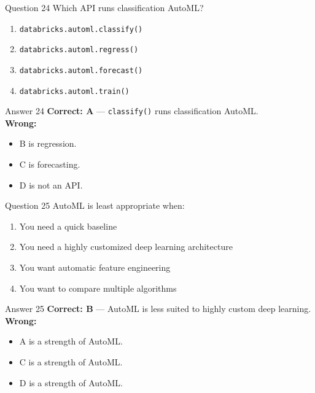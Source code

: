 \documentclass[aspectratio=169,11pt]{beamer}
\begin{document}
	\begin{frame}{Question 24}
		Which API runs classification AutoML?
		\begin{enumerate}[label=\Alph*.]
			\item \texttt{databricks.automl.classify()}
			\item \texttt{databricks.automl.regress()}
			\item \texttt{databricks.automl.forecast()}
			\item \texttt{databricks.automl.train()}
		\end{enumerate}
	\end{frame}
	\begin{frame}{Answer 24}
		\textbf{Correct: A} --- \texttt{classify()} runs classification AutoML.\\
		\vspace{0.5em}
		\textbf{Wrong:}
		\begin{itemize}
			\item B is regression.
			\item C is forecasting.
			\item D is not an API.
		\end{itemize}
	\end{frame}
	
	\begin{frame}{Question 25}
		AutoML is least appropriate when:
		\begin{enumerate}[label=\Alph*.]
			\item You need a quick baseline
			\item You need a highly customized deep learning architecture
			\item You want automatic feature engineering
			\item You want to compare multiple algorithms
		\end{enumerate}
	\end{frame}
	\begin{frame}{Answer 25}
		\textbf{Correct: B} --- AutoML is less suited to highly custom deep learning.\\
		\vspace{0.5em}
		\textbf{Wrong:}
		\begin{itemize}
			\item A is a strength of AutoML.
			\item C is a strength of AutoML.
			\item D is a strength of AutoML.
		\end{itemize}
	\end{frame}
	
\end{document}
